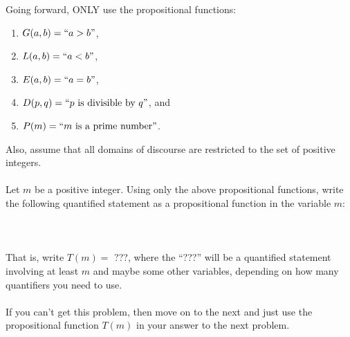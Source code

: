 \documentclass[12pt]{exam}
\begin{document}
\begin{questions}
    \question[3] Going forward, ONLY use the propositional functions: 
\begin{enumerate}
	\item $G(a,b) = \textmd{``}a > b\textmd{''}$, 
	\item $L(a,b) = \textmd{``}a < b\textmd{''}$,
	\item $E(a,b) = \textmd{``}a = b\textmd{''}$,
	\item $D(p,q) = \textmd{``}p\textmd{ is divisible by } q\textmd{''}$, and
	\item $P(m) = \textmd{``}m\textmd{ is a prime number''}$.
\end{enumerate}
Also, assume that all domains of discourse are restricted to the set of positive integers. \\
\\
    Let $m$ be a positive integer. Using only the above propositional functions, write the following quantified statement as a propositional function in the variable $m$: \\
    \\
     \\
    \\
    That is, write $T(m) =$ ???, where the ``???'' will be a quantified statement involving at least $m$ and maybe some other variables, depending on how many quantifiers you need to use. \\
    \\
    If you can't get this problem, then move on to the next and just use the propositional function $T(m)$ in your answer to the next problem. \\
\end{questions}
\end{document}
